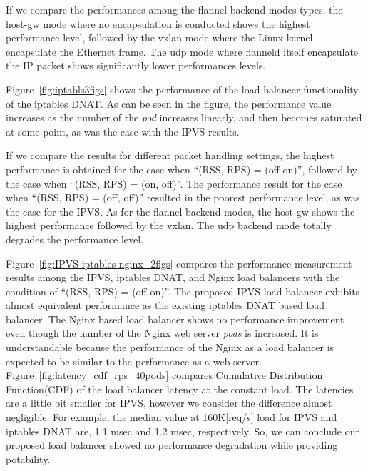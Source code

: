 If we compare the performances among the flannel backend modes types, 
the host-gw mode where no encapsulation is conducted shows the highest performance level,
followed by the vxlan mode where the Linux kernel encapsulate the Ethernet frame.
The udp mode where flanneld itself encapsulate the IP packet shows significantly lower performances levels.

Figure~\ref{fig:iptabls3figs} shows the performance of the load balancer 
functionality of the iptables DNAT. 
As can be seen in the figure, the performance value increases as the number of the {\em pod} increases linearly, 
and then becomes saturated at some point, as was the case with the IPVS results.

If we compare the results for different packet handling settings, the highest performance is 
obtained for the case when \enquote{(RSS, RPS) = (off on)}, followed by the case when \enquote{(RSS, RPS) = (on, off)}. 
The performance result for the case when \enquote{(RSS, RPS) = (off, off)} resulted in the 
poorest performance level, as was the case for the IPVS.
As for the flannel backend modes, the host-gw shows the highest performance followed 
by the vxlan. The udp backend mode totally degrades the performance level.

Figure~\ref{fig:IPVS-iptables-nginx_2figs} compares the performance measurement results 
among the IPVS, iptables DNAT, and Nginx load balancers
with the condition of \enquote{(RSS, RPS) = (off on)}.
The proposed IPVS load balancer exhibits almost equivalent performance as the existing iptables DNAT based load balancer. 
The Nginx based load balancer shows no performance improvement even though the number of the Nginx web server {\em pods} is increased.
It is understandable because the performance of the Nginx as a load balancer is expected to be similar to the performance as a web server.
Figure~\ref{fig:latency_cdf_rps_40pods} compares Cumulative Distribution Function(CDF) of the load balancer latency at the constant load.
The latencies are a little bit smaller for IPVS, however we consider the difference almost negligible.
For example, the median value at 160K[req/s] load for IPVS and iptables DNAT are, 1.1 msec and 1.2 msec, respectively.
So, we can conclude our proposed load balancer showed no performance degradation while providing potability.
